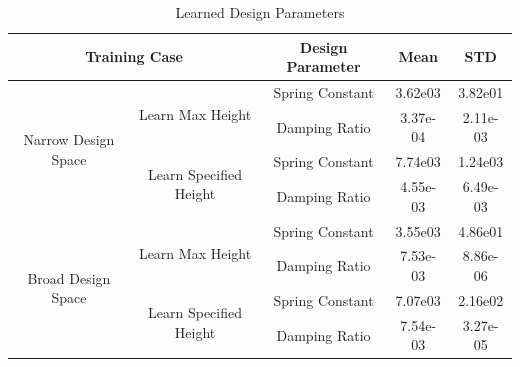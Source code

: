 \documentclass[10pt,twocolumn,letterpaper]{article}
\begin{document}
%
\begin{table}[ht]
        \caption{Learned Design Parameters}
        \vspace{-4mm}
        \label{tab:learned_design_params}
                \begin{center}
                \begin{tabular}{|c||c||c||c||c|}
                \hline
                \multicolumn{2}{|c||}{Training Case}                                                                           & Design Parameter & Mean     & STD      \\
                \hline
                \multirow{4}{*}{\centering Narrow Design Space}           & \multirow{2}{*}{\centering Learn Max Height}       & Spring Constant  & 3.62e03  & 3.82e01  \\
                                                                          &                                                    & Damping Ratio    & 3.37e-04 & 2.11e-03 \\
                                                                          & \multirow{2}{*}{\centering Learn Specified Height} & Spring Constant  & 7.74e03  & 1.24e03  \\
                                                                          &                                                    & Damping Ratio    & 4.55e-03 & 6.49e-03 \\
                \multirow{4}{*}{\centering Broad Design Space}            & \multirow{2}{*}{\centering Learn Max Height}       & Spring Constant  & 3.55e03  & 4.86e01  \\
                                                                          &                                                    & Damping Ratio    & 7.53e-03 & 8.86e-06 \\
                                                                          & \multirow{2}{*}{\centering Learn Specified Height} & Spring Constant  & 7.07e03  & 2.16e02  \\
                                                                          &                                                    & Damping Ratio    & 7.54e-03 & 3.27e-05 \\
                \hline
                \end{tabular}
                \end{center}
        \end{table}

\end{document}
